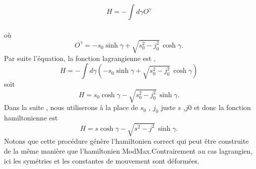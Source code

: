 \documentclass[12pt,a4paper, openany]{report}
\begin{document}
	$$H=-\int d{\gamma}O^{\gamma} $$\\
	où 
	\begin{equation}
		O^{\gamma}=-s_0\sinh{\gamma} +	\sqrt{s^2_0-j_0^2}\,\cosh{\gamma}.
	\end{equation}
	Par suite l'équation, la fonction lagrangienne est ,
	\begin{equation}
		H=-\int d{\gamma\left(-s_0\sinh{\gamma} +\sqrt{s^2_0-j_0^2}\,\cosh{\gamma}\right)}
	\end{equation}
	soit 
	\begin{equation}
		H=s_0\cosh{\gamma}-\sqrt{s^2_0-j_0^2}\,\sinh{\gamma} .
	\end{equation}
	Dans la suite , nous utiliserons à la place de $s_0$ , $j_0$ juste $s$ ,$j0$ et donc la fonction hamiltonienne est 
	\begin{equation}
		H=s\cosh{\gamma}-\sqrt{s^2-j^2}\,\sinh{\gamma} .
	\end{equation}
    Notons que cette procédure génère l'hamiltonien correct qui peut \^{e}tre construite de la m\^{e}me manière que l'hamiltonien ModMax.Contrairement au cas lagrangien, ici les symétries et les constantes de mouvement sont déformées.
\end{document}
